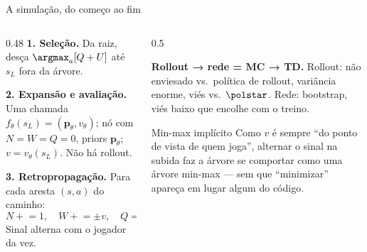 \documentclass[aspectratio=169, 10pt]{beamer}
\newcommand{\Nvis}{N}
\newcommand{\Wtot}{W}
\newcommand{\redeval}{v_{\theta}}
\newcommand{\redepol}{\bm{p}_{\theta}}
\begin{document}
\begin{frame}{A simulação, do começo ao fim}
  \small
  \begin{columns}[T]
    \begin{column}{0.48\textwidth}
      \textbf{1. Seleção.} Da raiz, desça $\argmax_a [Q+U]$ até $s_L$ fora da árvore.

      \medskip
      \textbf{2. Expansão e avaliação.} Uma chamada $f_{\theta}(s_L) = (\redepol, \redeval)$; nó com $\Nvis=\Wtot=Q=0$, priors $\redepol$; $v = \redeval(s_L)$. \alert{Não há rollout.}

      \medskip
      \textbf{3. Retropropagação.} Para cada aresta $(s,a)$ do caminho:
      \[
        \Nvis \mathrel{+}= 1, \quad
        \Wtot \mathrel{+}= \pm v, \quad
        Q = \Wtot/\Nvis .
      \]
      Sinal alterna com o jogador da vez.
    \end{column}
    \begin{column}{0.5\textwidth}
      \begin{ideiabox}
        \textbf{Rollout → rede = MC → TD.} Rollout: não enviesado vs.\ política de rollout, variância enorme, viés vs.\ $\polstar$. Rede: bootstrap, viés baixo que encolhe com o treino.
      \end{ideiabox}
      \begin{defbox}{Min-max implícito}
        Como $v$ é sempre ``do ponto de vista de quem joga'', alternar o sinal na
        subida faz a árvore se comportar como uma árvore min-max — sem que
        ``minimizar'' apareça em lugar algum do código.
      \end{defbox}
    \end{column}
  \end{columns}
\end{frame}
\end{document}
